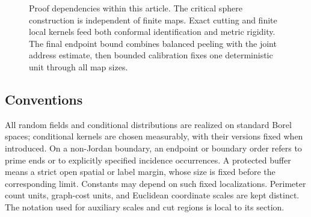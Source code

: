 \begin{figure}[p]
\centering

\caption{Proof dependencies within this article.  The critical sphere
construction is independent of finite maps.  Exact cutting and finite local
kernels feed both conformal identification and metric rigidity.  The final
endpoint bound combines balanced peeling with the joint address estimate,
then bounded calibration fixes one deterministic unit through all map sizes.}
\label{fig:proof-dependencies}
\end{figure}

\subsection{Conventions}

All random fields and conditional distributions are realized on standard Borel spaces; conditional kernels are chosen measurably, with their versions fixed when introduced. On a non-Jordan boundary, an endpoint or boundary order refers to prime ends or to explicitly specified incidence occurrences. A protected buffer means a strict open spatial or label margin, whose size is fixed before the corresponding limit. Constants may depend on such fixed localizations. Perimeter count units, graph-cost units, and Euclidean coordinate scales are kept distinct. The notation used for auxiliary scales and cut regions is local to its section.

